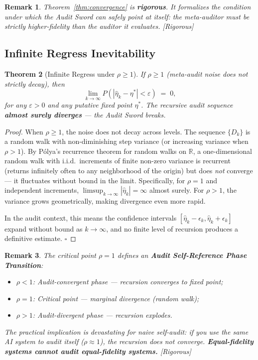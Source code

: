\documentclass[12pt,a4paper]{article}
\newtheorem{theorem}{Theorem}[section]
\newtheorem{remark}[theorem]{Remark}
\newcommand{\rigorous}{\textcolor{green!50!black}{\small\textsf{[Rigorous]}}}
\newcommand{\R}{\mathbb{R}}
\begin{document}
\begin{remark}
Theorem~\ref{thm:convergence} is \textbf{rigorous}.  It formalizes the
condition under which the Audit Sword can safely point at itself: the
meta-auditor must be \emph{strictly higher-fidelity} than the auditor it
evaluates.  \rigorous
\end{remark}

\subsection{Infinite Regress Inevitability}

\begin{theorem}[Infinite Regress under $\rho\geq1$]
\label{thm:divergence}
If $\rho\geq1$ (meta-audit noise does not strictly decay), then
\begin{equation}\label{eq:divergence-prob}
    \lim_{k\to\infty} P(|\hat{\eta}_k-\eta^*| < \varepsilon) \;=\; 0,
\end{equation}
for any $\varepsilon>0$ and any putative fixed point $\eta^*$.  The recursive
audit sequence \textbf{almost surely diverges} — the Audit Sword breaks.
\end{theorem}

\begin{proof}
When $\rho\geq1$, the noise does not decay across levels.  The sequence
$\{D_k\}$ is a random walk with non-diminishing step variance (or increasing
variance when $\rho>1$).  By P\'olya's recurrence theorem for random walks on
$\R$, a one-dimensional random walk with i.i.d.\ increments of finite
non-zero variance is recurrent (returns infinitely often to any neighborhood
of the origin) but does \emph{not} converge — it fluctuates without bound in
the limit.  Specifically, for $\rho=1$ and independent increments,
$\limsup_{k\to\infty}|\hat{\eta}_k|=\infty$ almost surely.  For $\rho>1$,
the variance grows geometrically, making divergence even more rapid.

In the audit context, this means the confidence intervals
$[\hat{\eta}_k-\epsilon_k,\hat{\eta}_k+\epsilon_k]$ expand without bound as
$k\to\infty$, and no finite level of recursion produces a definitive estimate.
$\square$
\end{proof}

\begin{remark}
The critical point $\rho=1$ defines an \textbf{Audit Self-Reference Phase
Transition}:
\begin{itemize}
    \item $\rho<1$: Audit-convergent phase — recursion converges to fixed point;
    \item $\rho=1$: Critical point — marginal divergence (random walk);
    \item $\rho>1$: Audit-divergent phase — recursion explodes.
\end{itemize}
The practical implication is devastating for naive self-audit: if you use the
\emph{same} AI system to audit itself ($\rho\approx1$), the recursion does not
converge.  \textbf{Equal-fidelity systems cannot audit equal-fidelity systems.}
\rigorous
\end{remark}
\end{document}
